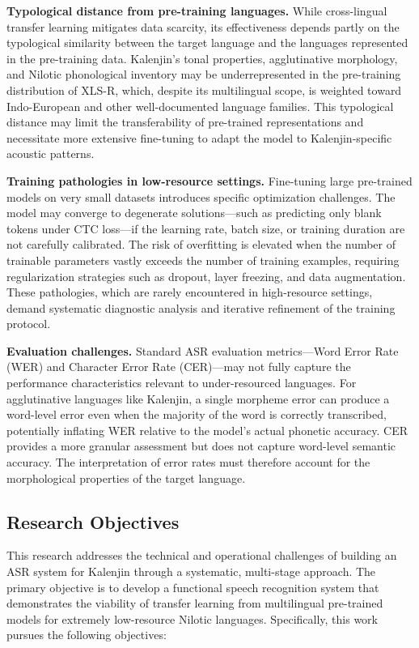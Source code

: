 \documentclass[12pt,a4paper]{article}
\begin{document}
\textbf{Typological distance from pre-training languages.} While cross-lingual transfer learning mitigates data scarcity, its effectiveness depends partly on the typological similarity between the target language and the languages represented in the pre-training data. Kalenjin's tonal properties, agglutinative morphology, and Nilotic phonological inventory may be underrepresented in the pre-training distribution of XLS-R, which, despite its multilingual scope, is weighted toward Indo-European and other well-documented language families. This typological distance may limit the transferability of pre-trained representations and necessitate more extensive fine-tuning to adapt the model to Kalenjin-specific acoustic patterns.

\textbf{Training pathologies in low-resource settings.} Fine-tuning large pre-trained models on very small datasets introduces specific optimization challenges. The model may converge to degenerate solutions---such as predicting only blank tokens under CTC loss---if the learning rate, batch size, or training duration are not carefully calibrated. The risk of overfitting is elevated when the number of trainable parameters vastly exceeds the number of training examples, requiring regularization strategies such as dropout, layer freezing, and data augmentation. These pathologies, which are rarely encountered in high-resource settings, demand systematic diagnostic analysis and iterative refinement of the training protocol.

\textbf{Evaluation challenges.} Standard ASR evaluation metrics---Word Error Rate (WER) and Character Error Rate (CER)---may not fully capture the performance characteristics relevant to under-resourced languages. For agglutinative languages like Kalenjin, a single morpheme error can produce a word-level error even when the majority of the word is correctly transcribed, potentially inflating WER relative to the model's actual phonetic accuracy. CER provides a more granular assessment but does not capture word-level semantic accuracy. The interpretation of error rates must therefore account for the morphological properties of the target language.

\subsection{Research Objectives}

This research addresses the technical and operational challenges of building an ASR system for Kalenjin through a systematic, multi-stage approach. The primary objective is to develop a functional speech recognition system that demonstrates the viability of transfer learning from multilingual pre-trained models for extremely low-resource Nilotic languages. Specifically, this work pursues the following objectives:
\end{document}
